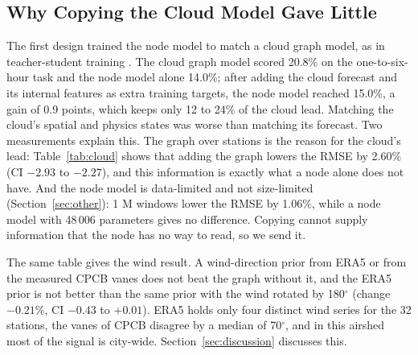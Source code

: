 \documentclass[journal]{IEEEtran}
\begin{document}
\subsection{Why Copying the Cloud Model Gave Little}
The first design trained the node model to match a cloud graph model, as in teacher-student training \cite{na2026privileged,fu2026rednet}. The cloud graph model scored 20.8\% on the one-to-six-hour task and the node model alone 14.0\%; after adding the cloud forecast and its internal features as extra training targets, the node model reached 15.0\%, a gain of 0.9 points, which keeps only 12 to 24\% of the cloud lead. Matching the cloud's spatial and physics states was worse than matching its forecast. Two measurements explain this. The graph over stations is the reason for the cloud's lead: Table~\ref{tab:cloud} shows that adding the graph lowers the RMSE by 2.60\% (CI $-2.93$ to $-2.27$), and this information is exactly what a node alone does not have. And the node model is data-limited and not size-limited (Section~\ref{sec:other}): 1 M windows lower the RMSE by 1.06\%, while a node model with 48\,006 parameters gives no difference. Copying cannot supply information that the node has no way to read, so we send it.

\begin{table}[!htb]
\caption{Cloud Graph Model, Skill (\%) for $+1$ to $+6$ h at Known Places (Mean $\pm$ Std over Seeds) and Change of RMSE (\%) With 95\% CI Against the Row Named in the Text}
\label{tab:cloud}
\centering\footnotesize
\setlength{\tabcolsep}{3pt}

\end{table}

The same table gives the wind result. A wind-direction prior from ERA5 or from the measured CPCB vanes does not beat the graph without it, and the ERA5 prior is not better than the same prior with the wind rotated by 180$^\circ$ (change $-0.21\%$, CI $-0.43$ to $+0.01$). ERA5 holds only four distinct wind series for the 32 stations, the vanes of CPCB disagree by a median of 70$^\circ$, and in this airshed most of the signal is city-wide. Section~\ref{sec:discussion} discusses this.
\end{document}
